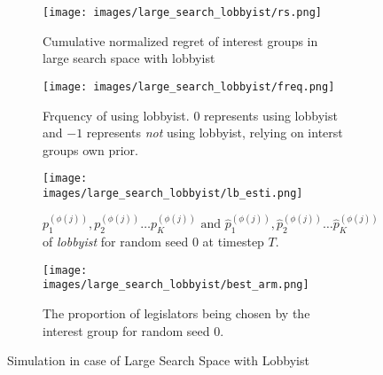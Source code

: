 \documentclass{article}
\begin{document}







\begin{figure}[h!]
    \centering %
    \begin{subfigure}[b]{0.45\textwidth}
        
        \texttt{[image: images/large\_search\_lobbyist/rs.png]}
        
        \caption{Cumulative normalized regret of interest groups in large search space with lobbyist}
        \label{fig:rs_lb}

    \end{subfigure}
    \hfill
    \begin{subfigure}[b]{0.45\textwidth}
        \texttt{[image: images/large\_search\_lobbyist/freq.png]}
        \caption{Frquency of using lobbyist. $0$ represents using lobbyist and $-1$ represents 
        \textit{not} using lobbyist, relying on interst groups own prior.
        }
        \label{fig:lbproba}
    \end{subfigure}

    \begin{subfigure}[b]{0.45\textwidth}
        
        \texttt{[image: images/large\_search\_lobbyist/lb\_esti.png]}
        
        \caption{$p_1^{(\phi(j))}, p_2^{(\phi(j))} \hdots p_K^{(\phi(j))} \text{ and } \hat{p}_1^{(\phi(j))}, \hat{p}_2^{(\phi(j))} \hdots \hat{p}_K^{(\phi(j))}$ of \textit{lobbyist} for random seed $0$ at timestep $T$.}
        \label{fig:esti_lb}

    \end{subfigure}
    \hfill
    \begin{subfigure}[b]{0.45\textwidth}
        \texttt{[image: images/large\_search\_lobbyist/best\_arm.png]}
        \caption{The proportion of legislators being chosen by the interest group for random seed $0$.}
        \label{fig:lbpropo}
    \end{subfigure}

    \caption{Simulation in case of Large Search Space with Lobbyist}
\end{figure}
\end{document}
